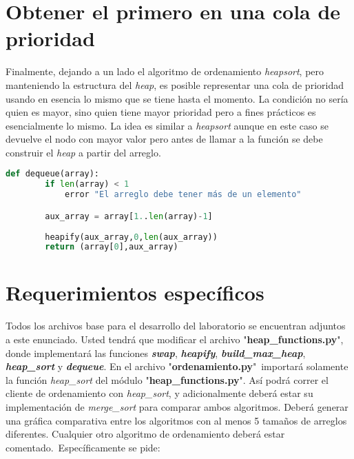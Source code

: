 \documentclass[11pt,letterpaper]{article}
\begin{document}


\section*{Obtener el primero en una cola de prioridad}

Finalmente, dejando a un lado el algoritmo de ordenamiento \textit{heapsort}, pero manteniendo la estructura del \textit{heap}, es posible representar una cola de prioridad usando en esencia lo mismo que se tiene hasta el momento. La condición no sería quien es mayor, sino quien tiene mayor prioridad pero a fines prácticos es esencialmente lo mismo. La idea es similar a \textit{heapsort} aunque en este caso se devuelve el nodo con mayor valor pero antes de llamar a la función se debe construir el \textit{heap} a partir del arreglo.

\vspace{1em}

\begin{center}
\begin{lstlisting}[language=Python,frame=single,mathescape]
    def dequeue(array):
        if len(array) < 1
            error "El arreglo debe tener más de un elemento"

        aux_array = array[1..len(array)-1]
        
        heapify(aux_array,0,len(aux_array))
        return (array[0],aux_array)
\end{lstlisting}
\end{center}


\section*{Requerimientos específicos}

Todos los archivos base para el desarrollo del laboratorio se encuentran adjuntos a este enunciado. Usted tendrá que modificar el archivo "\textbf{heap\_functions.py}", donde implementará las funciones \textbf{\textit{swap}}, \textbf{\textit{heapify}}, \textbf{\textit{build\_max\_heap}}, \textbf{\textit{heap\_sort}} y \textbf{\textit{dequeue}}. En el archivo "\textbf{ordenamiento.py}"\ importará solamente la función \textit{heap\_sort} del módulo "\textbf{heap\_functions.py}". Así podrá correr el cliente de ordenamiento con \textit{heap\_sort}, y adicionalmente deberá estar su implementación de \textit{merge\_sort} para comparar ambos algoritmos. Deberá generar una gráfica comparativa entre los algoritmos con al menos 5 tamaños de arreglos diferentes. Cualquier otro algoritmo de ordenamiento deberá estar comentado.\ Específicamente se pide:
\end{document}
